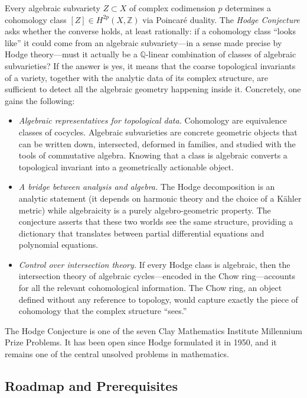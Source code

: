 \documentclass{article}
\newcommand{\Q}{\mathbb{Q}}
\newcommand{\Z}{{\mathbb{Z}}}
\begin{document}
Every algebraic subvariety $Z \subset X$ of complex codimension $p$ determines a cohomology class $[Z] \in
H^{2p}(X, \Z)$ via Poincar\'{e} duality. The \emph{Hodge Conjecture} asks whether the converse holds, at least
rationally: if a cohomology class ``looks like'' it could come from an algebraic subvariety---in a sense made
precise by Hodge theory---must it actually be a $\Q$-linear combination of classes of algebraic subvarieties?
If the answer is yes, it means that the coarse topological invariants of a variety, together with the analytic
data of its complex structure, are sufficient to detect all the algebraic geometry happening inside it.
Concretely, one gains the following:
\begin{itemize}
  \item \emph{Algebraic representatives for topological data.}
    Cohomology are equivalence classes of cocycles.
    Algebraic subvarieties are concrete geometric objects that can be
    written down, intersected, deformed in families, and studied with the
    tools of commutative algebra. Knowing that a class is algebraic
    converts a topological invariant into a geometrically actionable object.
  \item \emph{A bridge between analysis and algebra.}
    The Hodge decomposition is an analytic statement (it depends on
    harmonic theory and the choice of a K\"{a}hler metric) while
    algebraicity is a purely algebro-geometric property. The conjecture
    asserts that these two worlds see the same structure, providing a
    dictionary that translates between partial differential equations
    and polynomial equations.
  \item \emph{Control over intersection theory.}
    If every Hodge class is algebraic, then the intersection theory of
    algebraic cycles---encoded in the Chow ring---accounts for all the
    relevant cohomological information. The Chow ring, an object defined
    without any reference to topology, would capture exactly the piece of
    cohomology that the complex structure ``sees.''
\end{itemize}

The Hodge Conjecture is one of the seven Clay Mathematics Institute
Millennium Prize Problems. It has been open since Hodge formulated it in
1950, and it remains one of the central unsolved problems in mathematics.

\subsection{Roadmap and Prerequisites}\label{subsec:roadmap}
\end{document}
